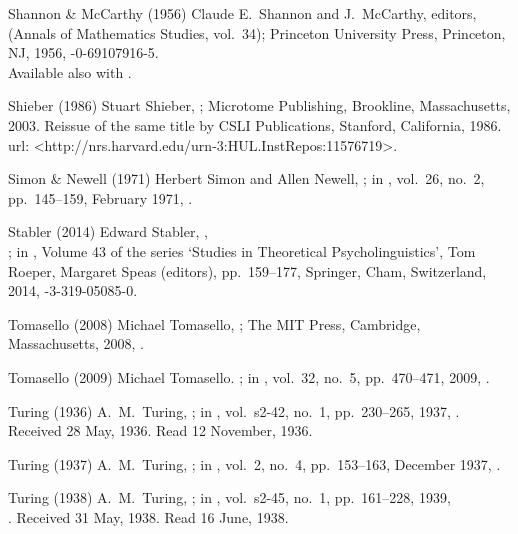 \biblabel Shannon \& McCarthy (1956)
Claude E.\ Shannon and J.\ McCarthy, editors,
(Annals of Mathematics Studies, vol.\ 34);
Princeton University Press, Princeton, NJ, 1956,
-0-69107916-5.\\
Available also with .

\biblabel Shieber (1986)
Stuart Shieber,
;
Microtome Publishing, Brookline, Massachusetts, 2003.
Reissue of the same title by
CSLI Publications, Stanford, California, 1986.\\
{\sc url:} \URL<http://nrs.harvard.edu/urn-3:HUL.InstRepos:11576719>.

\biblabel Simon \& Newell (1971)
Herbert Simon and Allen Newell,
;
in ,
 vol.\ 26, no.\ 2, pp.\ 145--159, February 1971,
.

\biblabel Stabler (2014)
Edward Stabler,
,\\
;
in ,
Volume 43 of the series ‘Studies in Theoretical Psycholinguistics’,
Tom Roeper, Margaret Speas (editors),
pp.\ 159--177,
Springer, Cham, Switzerland, 2014,
-3-319-05085-0.

\biblabel Tomasello (2008)
Michael Tomasello,
;
The MIT Press, Cambridge, Massachusetts, 2008,
.

\biblabel Tomasello (2009)
Michael Tomasello.
;
in ,
vol.\ 32, no.\ 5, pp.\ 470--471, 2009,
.

\biblabel Turing (1936)
A.\ M.\ Turing,
;
in ,
vol.\ s2-42, no.\ 1, pp.\ 230--265, 1937,
.
Received 28 May, 1936. Read 12 November, 1936.

\biblabel Turing (1937)
A.\ M.\ Turing,
; in
,
vol.\ 2, no.\ 4, pp.\ 153--163, December 1937,
.

\biblabel Turing (1938)
A.\ M.\ Turing,
;
in ,
vol.\ s2-45, no.\ 1, pp.\ 161--228, 1939,\\
.
Received 31 May, 1938. Read 16 June, 1938.

